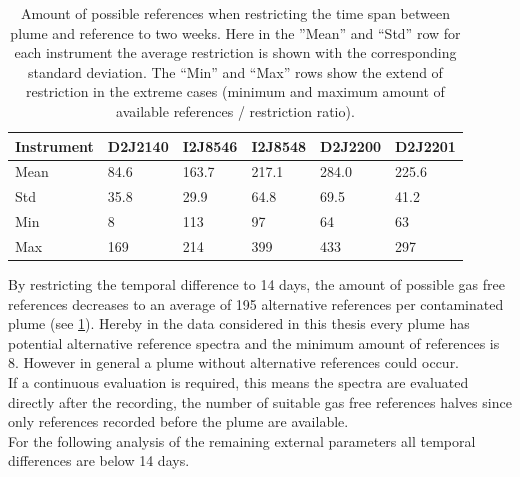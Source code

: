 \begin{table}[h]
	\centering
	\begin{tabular}{p{1.8cm}|p{2.15cm}p{2.15cm}p{2.15cm}p{2.15cm}p{2.15cm}|}
		Instrument	&D2J2140&I2J8546& I2J8548&D2J2200&D2J2201\\
		\toprule
		Mean&84.6 &163.7 &217.1&284.0 &225.6 \\
		\midrule
		Std&
		35.8&%
		29.9&%
		64.8&%
		69.5&%
		41.2\\%
		\midrule
		Min&
		8 &%
		113&%
		97 &%
		64&%
		63\\%
		\midrule
		Max&
		169&%
		214&%
		399&%
		433&%
		297\\%
		\bottomrule
	\end{tabular}
	\caption{Amount of possible references when restricting the time span between plume and reference to two weeks. Here in the ”Mean” and “Std” row for each  instrument the average restriction is shown with the corresponding standard deviation. The “Min” and “Max” rows show the extend of restriction in the extreme cases (minimum and maximum amount of available references / restriction ratio).}
	\label{Tab:refstime}
\end{table}	
By restricting the temporal difference to 14 days, the amount of possible gas free references decreases to an average of 195 alternative references per contaminated plume (see \cref{Tab:refstime}). Hereby in the data considered in this thesis every plume has potential alternative reference spectra and the minimum amount of references is 8. However in general a plume without alternative references could occur.\\
If a continuous evaluation is required, this means the spectra are evaluated directly after the recording, the number of suitable gas free references halves since only references recorded before the plume are available.\\
For the following analysis of the remaining external parameters all temporal differences are below 14 days.\\
\\
